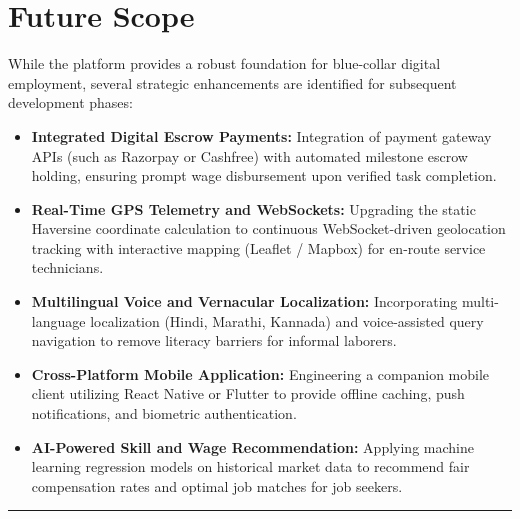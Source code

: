 \section{Future Scope}
While the platform provides a robust foundation for blue-collar digital employment, several strategic enhancements are identified for subsequent development phases:
\begin{itemize}
    \item \textbf{Integrated Digital Escrow Payments:} Integration of payment gateway APIs (such as Razorpay or Cashfree) with automated milestone escrow holding, ensuring prompt wage disbursement upon verified task completion.
    \item \textbf{Real-Time GPS Telemetry and WebSockets:} Upgrading the static Haversine coordinate calculation to continuous WebSocket-driven geolocation tracking with interactive mapping (Leaflet / Mapbox) for en-route service technicians.
    \item \textbf{Multilingual Voice and Vernacular Localization:} Incorporating multi-language localization (Hindi, Marathi, Kannada) and voice-assisted query navigation to remove literacy barriers for informal laborers.
    \item \textbf{Cross-Platform Mobile Application:} Engineering a companion mobile client utilizing React Native or Flutter to provide offline caching, push notifications, and biometric authentication.
    \item \textbf{AI-Powered Skill and Wage Recommendation:} Applying machine learning regression models on historical market data to recommend fair compensation rates and optimal job matches for job seekers.
\end{itemize}

\vspace{10mm}
\hrule
